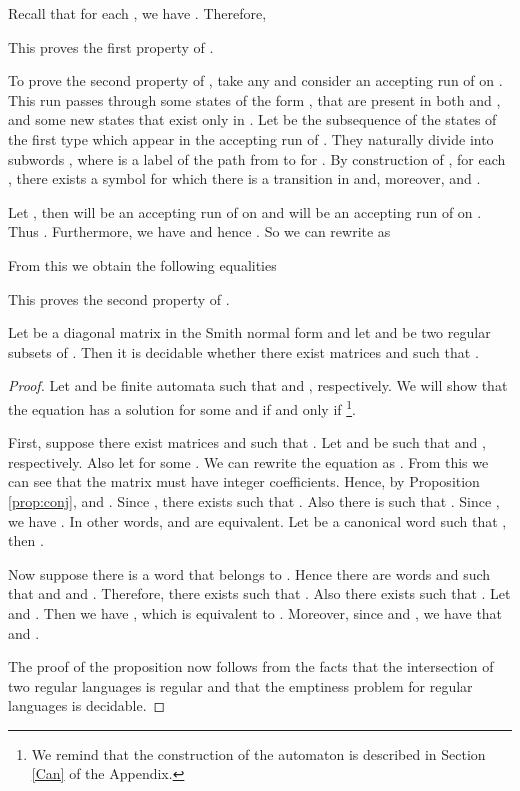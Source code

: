 \documentclass[fontsize=11pt,DIV=13,paper=letter]{scrartcl}
\theoremstyle{definition}
\begin{document}
Recall that for each , we have . Therefore,

This proves the first property of .

To prove the second property of , take any  and consider an accepting run of  on . This run passes through some states of the form , that are present in both  and , and some new states that exist only in . Let  be the subsequence of the states of the first type which appear in the accepting run of . They naturally divide  into subwords , where  is a label of the path from  to  for . By construction of , for each , there exists a symbol  for which there is a transition  in  and, moreover,  and .

Let , then  will be an accepting run of  on  and  will be an accepting run of  on . Thus . Furthermore, we have  and hence . So we can rewrite  as

From this we obtain the following equalities

This proves the second property of .


\begin{proposition}\label{prop:1diag}
Let  be a diagonal matrix in the Smith normal form and let  and  be two regular subsets of . Then it is decidable whether there exist matrices  and  such that .
\end{proposition}

\begin{proof}
Let  and  be finite automata such that  and , respectively. We will show that the equation  has a solution for some  and  if and only if \footnote{We remind that the construction of the automaton  is described in Section \ref{Can} of the Appendix.}.

First, suppose there exist matrices  and  such that . Let  and  be such that  and , respectively. Also let  for some . We can rewrite the equation  as . From this we can see that the matrix  must have integer coefficients. Hence, by Proposition \ref{prop:conj},  and . Since , there exists  such that . Also there is  such that . Since , we have . In other words,  and  are equivalent. Let  be a canonical word such that , then .

Now suppose there is a word  that belongs to . Hence there are words  and  such that  and  and . Therefore, there exists  such that . Also there exists  such that . Let  and . Then we have , which is equivalent to . Moreover, since  and , we have that  and .

The proof of the proposition now follows from the facts that the intersection of two regular languages is regular and that the emptiness problem for regular languages is decidable.
\end{proof}
\end{document}
